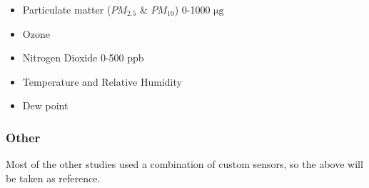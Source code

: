\begin{itemize}
	\item Particulate matter ($PM_{2.5}$ \& $PM_{10}$) 0-1000 $ \si{\micro\gram}$
	\item Ozone
	\item Nitrogen Dioxide 0-500 ppb
	\item Temperature and Relative Humidity
	\item 	Dew point
\end{itemize}

\subsubsection{Other}
\noindent
Most of the other studies used a combination of custom sensors, so the above will be taken as reference. 

